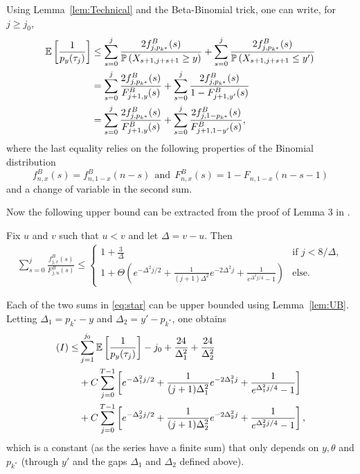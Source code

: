 Using Lemma~\ref{lem:Technical} and the Beta-Binomial trick, one can write, for $j \geq j_0$, 
\begin{align}
\nonumber
\mathbb{E}\left[\frac{1}{p_y(\tau_{j})}\right]
 & \leq
\sum_{s=0}^j \frac{2f^B_{j,p_{k^*}}(s)}{\mathbb{P}\left(X_{s+1,j+s+1} \geq y\right)}+\sum_{s=0}^j \frac{2f^B_{j,p_{k^*}}(s)}{\mathbb{P}\left(X_{s+1,j+s+1} \leq y'\right)} 
 \\ \nonumber & =
 \sum_{s=0}^j \frac{2f^B_{j,p_{k^*}}(s)}{F^B_{j+1,y}(s)} + \sum_{s=0}^j \frac{2f^B_{j,p_{k^*}}(s)}{1-F^B_{j+1,y'}(s)}
 \\ & = \sum_{s=0}^j \frac{2f^B_{j,p_{k^*}}(s)}{F^B_{j+1,y}(s)} + \sum_{s=0}^j \frac{2f^B_{j,1-p_{k^*}}(s)}{F^B_{j+1,1-y'}(s)},\label{eq:star}
\end{align}
where the last equality relies on the following properties of the Binomial distribution \[f^B_{n,x}(s) = f^B_{n,1-x}(n-s) \ \ \text{and} \ \ F^B_{n,x}(s) = 1 - F_{n,1-x}(n-s-1)\]
and a change of variable in the second sum. 

Now the following upper bound can be extracted from the proof of Lemma 3 in \cite{AGAISTAT13}. 

\begin{lemma}\label{lem:UB} Fix $u$ and $v$ such that $u < v$ and let $\Delta = v - u$. Then 
\begin{align*}
\sum_{s=0}^j \frac{f^B_{j,v}(s)}{F^B_{j,u}(s)} \leq
 \left\{\begin{array}{cl}
 1 + \frac{3}{\Delta} & \text{if } j < {8}/\Delta,
 \\
 1 + \Theta\left(e^{-\Delta^2 j /2} + \frac{1}{(j+1)\Delta^2}e^{-2\Delta^2 j} + \frac{1}{e^{\Delta^2j/4} - 1}\right) & \text{else.} 
\end{array}
\right.
\end{align*}
\end{lemma}

Each of the two sums in \eqref{eq:star} can be upper bounded using Lemma~\ref{lem:UB}. Letting $\Delta_1 = p_{k^*} - y$ and $\Delta_2 = y' - p_{k^*}$, one obtains  
\begin{align*}
 (I) \leq &
 	\sum_{j=1}^{j_0} \mathbb{E}\left[\frac{1}{p_y(\tau_{j})} \right]
 	- j_0 + \frac{24}{\Delta_1^2} + \frac{24}{\Delta_2^2} 
\\ &
	+ C \sum_{j=0}^{T-1} \left[e^{-\Delta_1^2 j /2} + \frac{1}{(j+1)\Delta_1^2}e^{-2\Delta_1^2 j} + \frac{1}{e^{\Delta_1^2j/4} - 1}\right]
\\ &
	+ C \sum_{j=0}^{T-1} \left[e^{-\Delta_2^2 j /2} + \frac{1}{(j+1)\Delta_2^2}e^{-2\Delta_2^2 j} + \frac{1}{e^{\Delta_2^2j/4} - 1}\right], 
\end{align*}
which is a constant (as the series have a finite sum) that only depends on $y, \theta$ and $p_{k^*}$ (through $y'$ and the gaps $\Delta_1$ and $\Delta_2$ defined above). 

